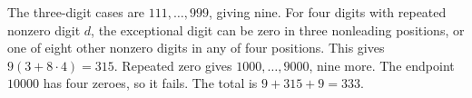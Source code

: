 The three-digit cases are $111,\ldots,999$, giving nine. For four digits with repeated nonzero digit $d$, the exceptional digit can be zero in three nonleading positions, or one of eight other nonzero digits in any of four positions. This gives $9(3+8\cdot4)=315$. Repeated zero gives $1000,\ldots,9000$, nine more. The endpoint $10000$ has four zeroes, so it fails. The total is $\boxed{9+315+9=333}$.
